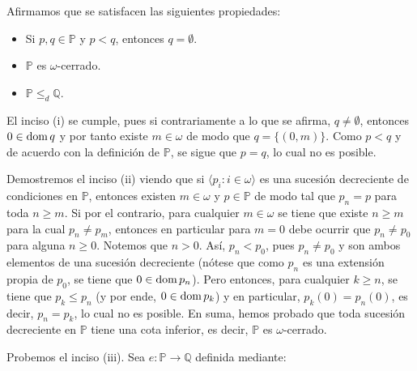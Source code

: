 \documentclass[11pt]{unam_tesis1}
\theoremstyle{MyThmStyle}
\theoremstyle{definition}
\theoremstyle{plain}
\theoremstyle{remark}
\def\dom{\mathop{\rm dom}\nolimits}
\let\leq\leqslant
\let\geq\geqslant
\begin{document}
Afirmamos que se satisfacen las siguientes propiedades:

\begin{itemize}
\item [(i)]Si $p,q\in \mathbb P$ y $p<q$, entonces $q=\emptyset$.
\item [(ii)]$\mathbb P$ es $\omega$-cerrado.

\item [(iii)]$\mathbb P\leq_d\mathbb Q$. 
\end{itemize}

El inciso (i) se cumple, pues si contrariamente a lo que se afirma, $q \neq \emptyset$, entonces $0\in \dom q$ y por tanto existe $m\in \omega$ de modo que $q=\{(0,m)\}$. Como $p<q$ y de acuerdo con la definici\'on de $\mathbb P$, se sigue que $p=q$, lo cual no es posible.

Demostremos el inciso (ii) viendo que si $\langle p_i:i\in \omega \rangle$ es una sucesi\'on decreciente de condiciones en $\mathbb P$, entonces existen $m\in \omega$ y $p\in \mathbb P$ de modo tal que $p_n=p$ para toda $n\geq m$. Si por el contrario, para cualquier $m\in \omega$ se tiene que existe $n\geq m$ para la cual $p_n\neq p_m$, entonces en particular para $m=0$ debe ocurrir que $p_n\neq p_0$ para alguna $n\geq 0$. Notemos que $n>0$. As\'i, $p_n<p_0$, pues $p_n\neq p_0$ y son ambos elementos de una sucesi\'on decreciente (n\'otese que como $p_n$ es una extensi\'on propia de $p_0$, se tiene que $0\in \dom p_n$). Pero entonces, para cualquier $k\geq n$, se tiene que $p_k\leq p_n$ (y por ende, $0\in \dom p_k$) y en particular, $p_k(0)=p_n(0)$, es decir, $p_n=p_k$, lo cual no es posible. En suma, hemos probado que toda sucesi\'on decreciente en $\mathbb P$ tiene una cota inferior, es decir, $\mathbb P$ es $\omega$-cerrado.

Probemos el inciso (iii). Sea $e:\mathbb P\to \mathbb Q$ definida mediante:
\end{document}

